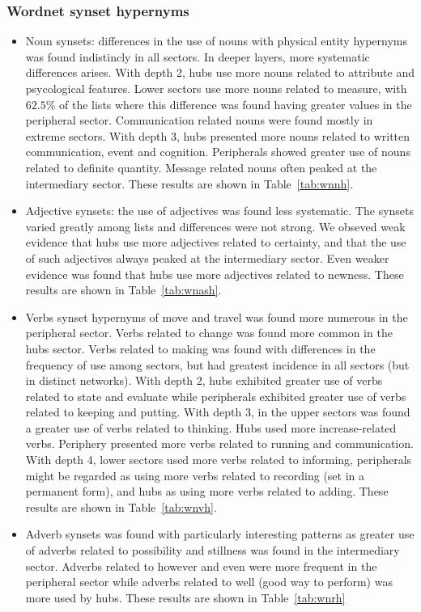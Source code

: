 \subsubsection{Wordnet synset hypernyms}\label{subsec:wn1}
\begin{itemize}
	\item Noun synsets: differences in the use of nouns with physical entity hypernyms was found indistincly in all sectors.
		In deeper layers, more systematic differences arises.
		With depth 2, hubs use more nouns related to attribute and psycological features.
		Lower sectors use more nouns related to measure,
		with $62.5\%$ of the lists where this difference was found having greater values in the peripheral sector.
		Communication related nouns were found mostly in extreme sectors.
		With depth 3, hubs presented more nouns related to written communication, event and cognition.
		Peripherals showed greater use of nouns related to definite quantity.
		Message related nouns often peaked at the intermediary sector.
		These results are shown in Table~\ref{tab:wnnh}.
	\item Adjective synsets: the use of adjectives was found less systematic.
		The synsets varied greatly among lists and differences were not strong.
		We obseved weak evidence that hubs use more adjectives related to certainty,
		and that the use of such adjectives always peaked at the intermediary sector.
		Even weaker evidence was found that hubs use more adjectives related to newness.
		These results are shown in Table~\ref{tab:wnash}.
	\item Verbs synset hypernyms of move and travel was found more numerous in the peripheral sector.
		Verbs related to change was found more common in the hubs sector.
		Verbs related to making was found with differences in the frequency of use among sectors,
		but had greatest incidence in all sectors (but in distinct networks).
		With depth 2, hubs exhibited greater use of verbs related to state and evaluate while
		peripherals exhibited greater use of verbs related to keeping and putting.
		With depth 3, in the upper sectors was found a greater use of verbs related to thinking.
		Hubs used more increase-related verbs.
		Periphery presented more verbs related to running and communication.
		With depth 4, lower sectors used more verbs related to informing, peripherals might be regarded as using more verbs related to recording (set in a permanent form), and hubs as using more verbs related to adding.
		These results are shown in Table~\ref{tab:wnvh}.
	\item Adverb synsets was found with particularly interesting patterns as greater use of adverbs related to possibility and stillness was found in the intermediary sector.
		Adverbs related to however and even were more frequent in the peripheral sector while adverbs related to well (good way to perform) was more used by hubs.
		These results are shown in Table~\ref{tab:wnrh}
\end{itemize}

